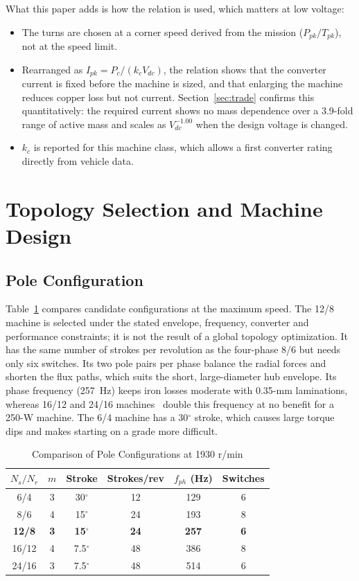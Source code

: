 \documentclass[journal]{IEEEtran}
\begin{document}
What this paper adds is how the relation is used, which matters at low voltage:
\begin{itemize}
\item The turns are chosen at a corner speed derived from the mission
($P_{pk}/T_{pk}$), not at the speed limit.
\item Rearranged as $I_{pk}=P_c/(k_cV_{dc})$, the relation shows that the converter
current is fixed before the machine is sized, and that enlarging the machine
reduces copper loss but not current. Section~\ref{sec:trade} confirms this
quantitatively: the required current shows no mass dependence over a
3.9-fold range of active mass and scales as $V_{dc}^{-1.00}$ when the design
voltage is changed.
\item $k_c$ is reported for this machine class, which allows a first converter
rating directly from vehicle data.
\end{itemize}

\section{Topology Selection and Machine Design}

\subsection{Pole Configuration}
Table~\ref{tab:poles} compares candidate configurations at the maximum speed.
The 12/8 machine is selected under the stated envelope, frequency, converter
and performance constraints; it is not the result of a global topology
optimization. It has the same number of strokes per revolution as the
four-phase 8/6 but needs only six switches. Its two pole pairs per phase
balance the radial forces and shorten the flux paths, which suits the short,
large-diameter hub envelope. Its phase frequency (257~Hz) keeps iron losses
moderate with 0.35-mm laminations, whereas 16/12 and 24/16
machines~\cite{bilgin2012,jiang2017} double this frequency at no benefit for a
250-W machine. The 6/4 machine has a 30$^\circ$ stroke, which causes large
torque dips and makes starting on a grade more difficult.

\begin{table}[!t]
\caption{Comparison of Pole Configurations at 1930 r/min}
\label{tab:poles}
\centering
\renewcommand{\arraystretch}{1.1}
\begin{tabular}{c c c c c c}
\hline
$N_s/N_r$ & $m$ & Stroke & Strokes/rev & $f_{ph}$ (Hz) & Switches\\
\hline
6/4 & 3 & 30$^\circ$ & 12 & 129 & 6\\
8/6 & 4 & 15$^\circ$ & 24 & 193 & 8\\
\textbf{12/8} & \textbf{3} & \textbf{15$^\circ$} & \textbf{24} & \textbf{257} & \textbf{6}\\
16/12 & 4 & 7.5$^\circ$ & 48 & 386 & 8\\
24/16 & 3 & 7.5$^\circ$ & 48 & 514 & 6\\
\hline
\end{tabular}
\end{table}
\end{document}
